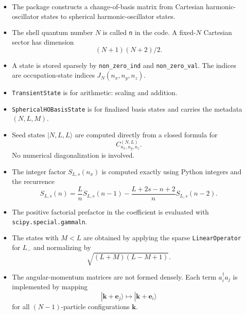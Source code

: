 \documentclass[11pt]{article}
\begin{document}
\begin{itemize}
    \item The package constructs a change-of-basis matrix from Cartesian
    harmonic-oscillator states to spherical harmonic-oscillator states.

    \item The shell quantum number \(N\) is called \texttt{n} in the code.
    A fixed-\(N\) Cartesian sector has dimension
    \[
        (N+1)(N+2)/2.
    \]

    \item A state is stored sparsely by \texttt{non\_zero\_ind} and
    \texttt{non\_zero\_val}. The indices are occupation-state indices
    \(J_N(n_x,n_y,n_z)\).

    \item \texttt{TransientState} is for arithmetic: scaling and addition.

    \item \texttt{SphericalHOBasisState} is for finalized basis states and
    carries the metadata \((N,L,M)\).

    \item Seed states \(|N,L,L\rangle\) are computed directly from a closed
    formula for
    \[
        C^{(N,L)}_{n_x,n_y,n_z}.
    \]
    No numerical diagonalization is involved.

    \item The integer factor \(S_{L,s}(n_x)\) is computed exactly using
    Python integers and the recurrence
    \[
        S_{L,s}(n)
        =
        \frac{L}{n}S_{L,s}(n-1)
        -
        \frac{L+2s-n+2}{n}S_{L,s}(n-2).
    \]

    \item The positive factorial prefactor in the coefficient is evaluated
    with \texttt{scipy.special.gammaln}.

    \item The states with \(M<L\) are obtained by applying the sparse
    \texttt{LinearOperator} for \(L_-\) and normalizing by
    \[
        \sqrt{(L+M)(L-M+1)}.
    \]

    \item The angular-momentum matrices are not formed densely. Each term
    \(a_i^\dagger a_j\) is implemented by mapping
    \[
        |\mathbf k+\mathbf e_j\rangle
        \mapsto
        |\mathbf k+\mathbf e_i\rangle
    \]
    for all \((N-1)\)-particle configurations \(\mathbf k\).
\end{itemize}
\end{document}
